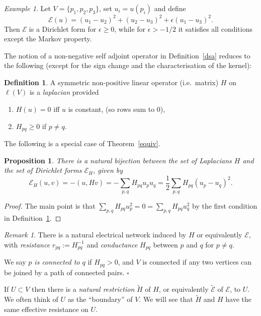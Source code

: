 \documentclass[a4paper]{amsart}
\theoremstyle{plain}
\newtheorem{proposition}[theorem]{Proposition}
\theoremstyle{definition}
\newtheorem{definition}[theorem]{Definition}%
\theoremstyle{remark}
\newtheorem{example}[theorem]{Example}
\newtheorem{remark}[theorem]{Remark}
\begin{document}
\begin{example}
Let $ V = \{ p_1, p_2, p_3 \} $, set $ u_i = u(p_i)   $   and define
\[
 \mathcal{E} (u) = (u_1 - u_2)^2 + (u_2 - u_3)^2 + \epsilon (u_1 - u_3 )^ 2 .
 \]
Then $ \mathcal{E} $ is a Dirichlet form for $ \epsilon \geq 0 $, while for $ \epsilon > -1/2 $ it satisfies all conditions except the Markov property.
\end{example}  

The notion of a non-negative self adjoint operator in Definition~\ref{dsa} reduces to the following (except for the sign change and the characterisation of the kernel):
\begin{definition} \label{dflap} A  symmetric non-positive linear operator (i.e.\ matrix) $ H $ on $ \ell(V) $ is a \emph{laplacian} provided
\begin{enumerate}
\item $ H(u) = 0 $ iff $ u $ is constant, (so rows sum to $ 0 $),
\item $ H_{pq} \geq 0 $ if $ p \neq q $.
\end{enumerate} 
\end{definition}

The following is a special case of Theorem~\ref{equiv}.
\begin{proposition} \label{bihd} There is a natural bijection between the set of Laplacians $ H $  and the set of Dirichlet forms $ \mathcal{E} _H $, given by
\[
\mathcal{E} _H(u,v) = - (u,Hv) = - \sum _{p,q} H_{pq}u_p u_q = \frac{1}{2} \sum_{p,q} H_{pq}(u_p - u_q )^2 .
\]
\end{proposition} 

\begin{proof} The main point is that $ \sum_{p,q}   H_{pq} u_p^2 = 0 =  \sum_{p,q}   H_{pq} u_q^2$ by the first condition in Definition~\ref{dflap}.
\end{proof}


\begin{remark} 
There is a natural electrical network induced by $ H $ or equivalently $ \mathcal{E} $, with  \emph{resistance} $ r_{pq} := H_{pq}^{-1}$ and \emph{conductance} $ H_{pq} $ between $ p $ and $ q $ for $ p \neq q $.  

We say \emph{$p $  is connected to $ q $}  if $ H_{pq} > 0 $, and $ V $ is connected if any two vertices can be joined by a path of connected pairs. 
\hfill $\square$  
\end{remark}  


If $ U \subset V $ then there is a \emph{natural restriction} $ \widetilde{H} $ of $ H $, or equivalently $ \widetilde{ \mathcal{E} } $ of $ \mathcal{E} $, to $ U $.
We often think of $ U $ as the ``boundary'' of $ V $.  We will see that $ \widetilde{H} $ and $ H $ have the same effective resistance on $ U $.
\end{document}
